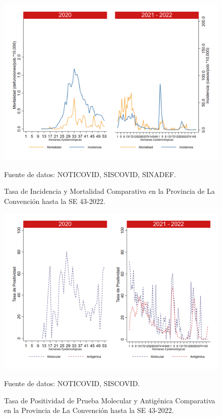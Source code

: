 \documentclass[12pt,a4paper,openany]{book}
\begin{document}
	\begin{figure}[h]
		\caption{Tasa de Incidencia y Mortalidad Comparativa en la Provincia de La Convención hasta la SE 43-2022.}\label{fig:inc_mort_laconv}
		\begin{center}
			\includegraphics[width=0.85\linewidth]{../figuras/incidencia_mortalidad_20_21_9.png}
		\end{center}
		{\footnotesize {Fuente de datos: NOTICOVID, SISCOVID, SINADEF.}}
	\end{figure}
	
	\begin{figure}[h]
		\caption{Tasa de Positividad de Prueba Molecular y Antigénica Comparativa en la Provincia de La Convención hasta la SE 43-2022.}\label{fig:positividad_laconv}
		\begin{center}
			\includegraphics[width=0.7\linewidth]{../figuras/positividad_20_21_9.png}
		\end{center}
		{\footnotesize {Fuente de datos: NOTICOVID, SISCOVID.}}
	\end{figure}
	
\end{document}

